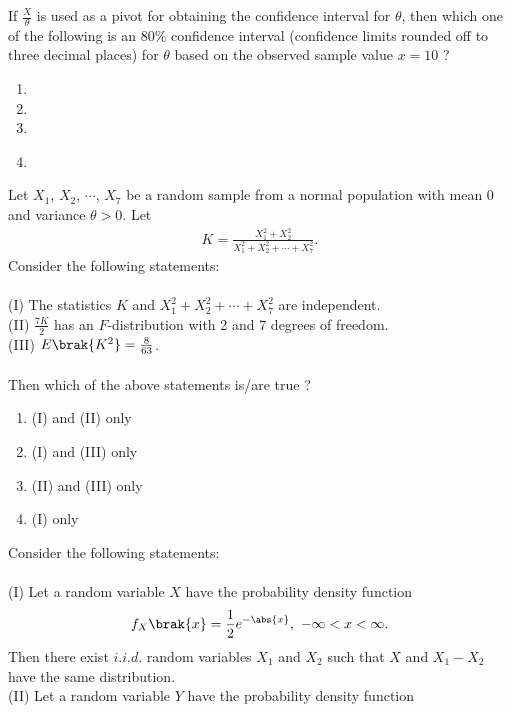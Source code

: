 If $\frac{X}{\theta}$ is used as a pivot for obtaining the confidence interval for $\theta$, then which one of the following is an 80\% confidence interval (confidence limits rounded off to three decimal places) for $\theta$ based on the observed sample value $x = 10$ ? 
\begin{enumerate}
    \item {}
    \item {} 
    \item {}
    \item {} \\
\end{enumerate}
\item Let $X_1$, $X_2$, $\cdots$, $X_7$ be a random sample from a normal population with mean 0 and variance $\theta > 0$. Let
\begin{align*}
    K = \frac{X_1^2 + X_2^2}{X_1^2 + X_2^2 + \cdots + X_7^2}.
\end{align*}
Consider the following statements:\\\\
(I) The statistics $K$ and $X_1^2 + X_2^2 + \cdots + X_7^2$ are independent.\\
(II) $\frac{7K}{2}$ has an $F$-distribution with 2 and 7 degrees of freedom.\\
(III) $E\brak{K^2} = \frac{8}{63}$. \\\\
Then which of the above statements is/are true ?
\begin{enumerate}
    \item (I) and (II) only
    \item (I) and (III) only
    \item (II) and (III) only
    \item (I) only \\
\end{enumerate}
\item Consider the following statements:\\\\
(I) Let a random variable $X$ have the probability density function
\begin{align*}
    f_X\brak{x} = \frac{1}{2}e^{-\abs{x}},\ -\infty < x < \infty.
\end{align*}
Then there exist $i.i.d.$ random variables $X_1$ and $X_2$ such that $X$ and
$X_1 - X_2$ have the same distribution.\\ 
(II) Let a random variable $Y$ have the probability density function 
